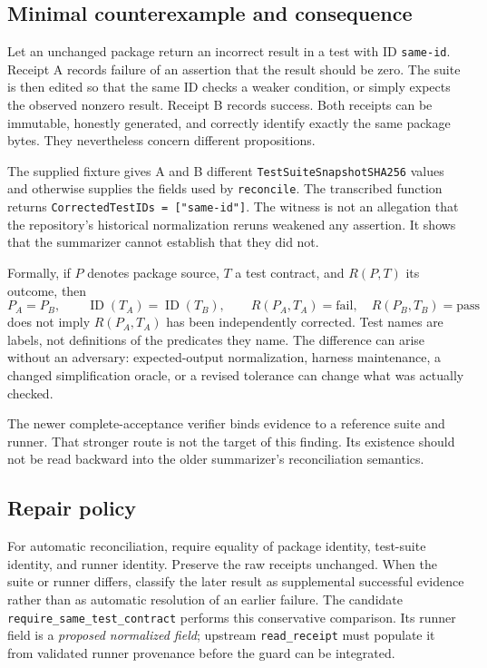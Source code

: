 \documentclass[11pt,letterpaper]{article}
\newcommand{\code}[1]{\nolinkurl{#1}}
\begin{document}
\subsection{Minimal counterexample and consequence}

Let an unchanged package return an incorrect result in a test with ID
\code{same-id}. Receipt A records failure of an assertion that the result should
be zero. The suite is then edited so that the same ID checks a weaker condition,
or simply expects the observed nonzero result. Receipt B records success.
Both receipts can be immutable, honestly generated, and correctly identify
exactly the same package bytes. They nevertheless concern different
propositions.

The supplied fixture gives A and B different
\code{TestSuiteSnapshotSHA256} values and otherwise supplies the fields used by
\code{reconcile}. The transcribed function returns
\code{CorrectedTestIDs = ["same-id"]}. The witness is not an allegation that the
repository's historical normalization reruns weakened any assertion. It shows
that the summarizer cannot establish that they did not.

Formally, if $P$ denotes package source, $T$ a test contract, and $R(P,T)$ its
outcome, then
\[
 P_A=P_B,\qquad \operatorname{ID}(T_A)=\operatorname{ID}(T_B),\qquad
 R(P_A,T_A)=\mathrm{fail},\quad R(P_B,T_B)=\mathrm{pass}
\]
does not imply $R(P_A,T_A)$ has been independently corrected. Test names are
labels, not definitions of the predicates they name. The difference can arise
without an adversary: expected-output normalization, harness maintenance, a
changed simplification oracle, or a revised tolerance can change what was
actually checked.

The newer complete-acceptance verifier binds evidence to a reference suite and
runner. That stronger route is not the target of this finding. Its existence
should not be read backward into the older summarizer's reconciliation
semantics.\cite{acceptance}

\subsection{Repair policy}

For automatic reconciliation, require equality of package identity,
test-suite identity, and runner identity. Preserve the raw receipts unchanged.
When the suite or runner differs, classify the later result as supplemental
successful evidence rather than as automatic resolution of an earlier failure.
The candidate \code{require_same_test_contract} performs this conservative
comparison. Its runner field is a \emph{proposed normalized field}; upstream
\code{read_receipt} must populate it from validated runner provenance before
the guard can be integrated.
\end{document}
